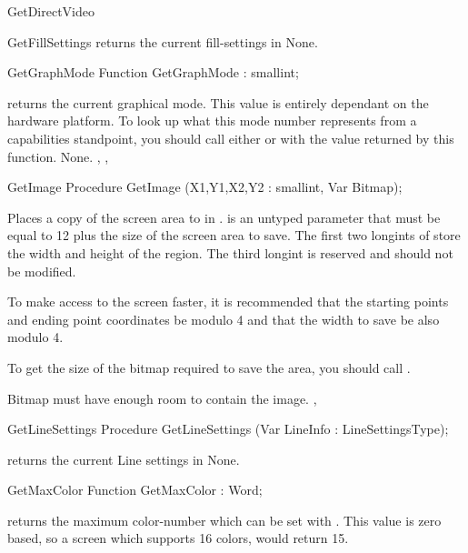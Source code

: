 \begin{function}{GetDirectVideo}
\begin{procedure}{GetFillSettings}
\Description
{} returns the current fill-settings in
\Errors
None.
\SeeAlso
{}
\end{procedure}

\begin{function}{GetGraphMode}
\Declaration
Function GetGraphMode  : smallint;

\Description
{} returns the current graphical mode. This value is
entirely dependant on the hardware platform. To look up what this
mode number represents from a capabilities standpoint, you should
call either  or  with the
value returned by this function.
\Errors
None.
\SeeAlso
{}, , 
\end{function}

\begin{procedure}{GetImage}
\Declaration
Procedure GetImage (X1,Y1,X2,Y2 : smallint, Var Bitmap);

\Description
{}
Places a copy of the screen area  to  in .
 is an untyped parameter that must be equal to 12 plus the size
of the screen area to save. The first two longints of  store
the width and height of the region. The third longint is reserved and should
not be modified.

To make access to the screen faster, it is recommended that the starting
points and ending point coordinates be modulo 4 and that the width to
save be also modulo 4.

To get the size of the bitmap required to save the area, you should call
.

\Errors
Bitmap must have enough room to contain the image.
\SeeAlso
{},
\end{procedure}

\begin{procedure}{GetLineSettings}
\Declaration
Procedure GetLineSettings (Var LineInfo : LineSettingsType);

\Description
{} returns the current Line settings in
\Errors
None.
\SeeAlso
{}
\end{procedure}
\begin{function}{GetMaxColor}
\Declaration
Function GetMaxColor  : Word;

\Description
{} returns the maximum color-number which can
be set with . This value is zero based, so a screen
which supports 16 colors, would return 15.


\end{function}
\end{function}

